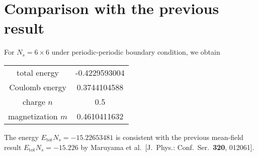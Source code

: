 \documentclass[a4paper,11pt]{article}
\begin{document}
\section{Comparison with the previous result}

For $N_s=6\times 6$ under periodic-periodic boundary condition, we obtain
\begin{table}[h!]
\centering
\begin{tabular}{c|c}
\hline
 total energy & -0.4229593004 \\
 Coulomb energy & 0.3744104588 \\
 charge $n$ & 0.5 \\
 magnetization $m$ & 0.4610411632 \\
\hline
\end{tabular}
\end{table}

The energy $E_{\mathrm{tot}}N_s = -15.22653481$ is consistent with the previous mean-field result
$E_{\mathrm{tot}}N_s = -15.226$ by Maruyama et al.\
[J.\ Phys.: Conf.\ Ser.\ {\bf 320}, 012061].


\end{document}
